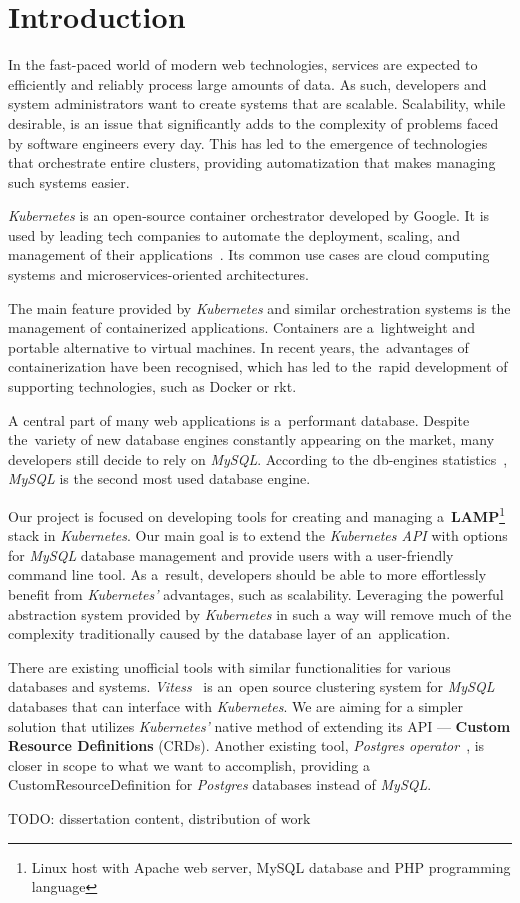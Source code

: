 \chapter{Introduction}
In the fast-paced world of modern web technologies, services are expected to
efficiently and reliably process large amounts of data. As such, developers
and system administrators want to create systems that are scalable. Scalability,
while desirable, is an issue that significantly adds to the complexity of
problems faced by software engineers every day. This has led to the emergence of
technologies that orchestrate entire clusters, providing automatization that
makes managing such systems easier.

\textit{Kubernetes} is an open-source container orchestrator developed by
Google. It is used by leading tech companies to automate the deployment,
scaling, and management of their applications~\cite{kube-usecase}. Its common
use cases are cloud computing systems and microservices-oriented architectures.

The main feature provided by \textit{Kubernetes} and similar orchestration
systems is the management of containerized applications. Containers are
a~lightweight and portable alternative to virtual machines. In recent years,
the~advantages of containerization have been recognised, which has led to
the~rapid development of supporting technologies, such as Docker or rkt.

A central part of many web applications is a~performant database. Despite
the~variety of new database engines constantly appearing on the market, many
developers still decide to rely on \textit{MySQL}. According to the db-engines
statistics~\cite{db-eng}, \textit{MySQL} is the second most used database
engine.

Our project is focused on developing tools for creating and managing
a~\textbf{LAMP}\footnote{Linux host with Apache web server, MySQL database
and PHP programming language} stack in \textit{Kubernetes}. Our main goal is to
extend the \textit{Kubernetes API} with options for \textit{MySQL} database
management and provide users with a user-friendly command line tool. As
a~result, developers should be able to more effortlessly benefit from
\textit{Kubernetes’} advantages, such as scalability. Leveraging the powerful
abstraction system provided by \textit{Kubernetes} in such a way will remove
much of the complexity traditionally caused by the database layer of
an~application.

There are existing unofficial tools with similar functionalities for various
databases and systems. \textit{Vitess}~\cite{vitess} is an~open source
clustering system for \textit{MySQL} databases that can interface with
\textit{Kubernetes}. We are aiming for a simpler solution that utilizes
\textit{Kubernetes'} native method of extending its API ---
\textbf{Custom Resource Definitions} (CRDs). Another existing tool,
\textit{Postgres operator}~\cite{psql-op}, is closer in scope to what we want to
accomplish, providing a CustomResourceDefinition for \textit{Postgres} 
databases instead of \textit{MySQL}.

TODO: dissertation content, distribution of work
